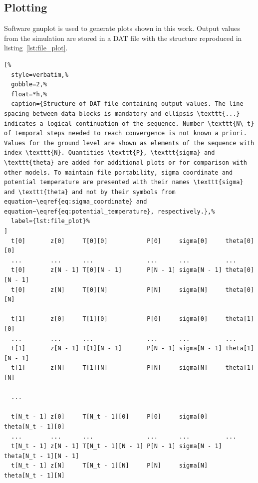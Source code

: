 \documentclass[a4paper,10pt,twocolumn,\classoptions]{article}
\begin{document}
\subsection{Plotting}
\label{sec:Plotting}
Software gnuplot is used to generate plots shown in this work. Output values from the simulation are stored in a DAT file with the structure reproduced in listing~\ref{lst:file_plot}.
\begin{lstlisting}[%
  style=verbatim,%
  gobble=2,%
  float=*h,%
  caption={Structure of DAT file containing output values. The line spacing between data blocks is mandatory and ellipsis \texttt{...} indicates a logical continuation of the sequence. Number \texttt{N\_t} of temporal steps needed to reach convergence is not known a priori. Values for the ground level are shown as elements of the sequence with index \texttt{N}. Quantities \texttt{P}, \texttt{sigma} and \texttt{theta} are added for additional plots or for comparison with other models. To maintain file portability, sigma coordinate and potential temperature are presented with their names \texttt{sigma} and \texttt{theta} and not by their symbols from equation~\eqref{eq:sigma_coordinate} and equation~\eqref{eq:potential_temperature}, respectively.},%
  label={lst:file_plot}%
]
  t[0]       z[0]     T[0][0]           P[0]     sigma[0]     theta[0][0]
  ...        ...      ...               ...      ...          ...
  t[0]       z[N - 1] T[0][N - 1]       P[N - 1] sigma[N - 1] theta[0][N - 1]
  t[0]       z[N]     T[0][N]           P[N]     sigma[N]     theta[0][N]

  t[1]       z[0]     T[1][0]           P[0]     sigma[0]     theta[1][0]
  ...        ...      ...               ...      ...          ...
  t[1]       z[N - 1] T[1][N - 1]       P[N - 1] sigma[N - 1] theta[1][N - 1]
  t[1]       z[N]     T[1][N]           P[N]     sigma[N]     theta[1][N]

  ...

  t[N_t - 1] z[0]     T[N_t - 1][0]     P[0]     sigma[0]     theta[N_t - 1][0]
  ...        ...      ...               ...      ...          ...
  t[N_t - 1] z[N - 1] T[N_t - 1][N - 1] P[N - 1] sigma[N - 1] theta[N_t - 1][N - 1]
  t[N_t - 1] z[N]     T[N_t - 1][N]     P[N]     sigma[N]     theta[N_t - 1][N]
\end{lstlisting}



\newpage
\printbibliography[heading=bibintoc]
\end{document}
